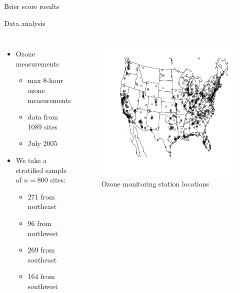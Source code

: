 \documentclass{beamer}
\begin{document}
\begin{frame}{Brier score results}
\centering

\end{frame}

\begin{frame}{Data analysis}
\begin{columns}[c]
	\begin{itemize} \setlength{\itemsep}{0.5em}
	\item Ozone measurements
	\begin{itemize}
		\item max 8-hour ozone measurements
		\item data from 1089 sites
		\item July 2005
	\end{itemize}
  \item We take a stratified sample of $n = 800$ sites:
  \begin{itemize}
    \item 271 from northeast
    \item 96 from northwest
    \item 269 from southeast
    \item 164 from southwest
  \end{itemize}
	\end{itemize}

	\begin{figure}
    \includegraphics[width=1\linewidth]{./plots/pot/ozone_stations.pdf}
    \caption{Ozone monitoring station locations}
    \end{figure}
\end{columns}
\end{frame}
\end{document}
